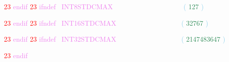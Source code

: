 \documentclass[8, usernames, dvipsnames]{beamer}
\begin{document}
\begin{frame}
 \textcolor{Red}{23}
\textcolor{Violet}{endif}
  \textcolor{Red}{23}
\textcolor{Violet}{ifndef}\textcolor{White}{\ }
\textcolor{Violet}{INT8STDCMAX}
 \textcolor{White}{\ }
\textcolor{White}{\ }
\textcolor{White}{\ }
\textcolor{White}{\ }
\textcolor{White}{\ }
\textcolor{White}{\ }
\textcolor{White}{\ }
\textcolor{White}{\ }
\textcolor{White}{\ }
\textcolor{White}{\ }
\textcolor{White}{\ }
\textcolor{White}{\ }
\textcolor{SkyBlue}{(}
\textcolor{SeaGreen}{127}
\textcolor{SkyBlue}{)}

  \textcolor{Red}{23}
\textcolor{Violet}{endif}
  \textcolor{Red}{23}
\textcolor{Violet}{ifndef}\textcolor{White}{\ }
\textcolor{Violet}{INT16STDCMAX}
 \textcolor{White}{\ }
\textcolor{White}{\ }
\textcolor{White}{\ }
\textcolor{White}{\ }
\textcolor{White}{\ }
\textcolor{White}{\ }
\textcolor{White}{\ }
\textcolor{White}{\ }
\textcolor{White}{\ }
\textcolor{White}{\ }
\textcolor{White}{\ }
\textcolor{SkyBlue}{(}
\textcolor{SeaGreen}{32767}
\textcolor{SkyBlue}{)}

  \textcolor{Red}{23}
\textcolor{Violet}{endif}
  \textcolor{Red}{23}
\textcolor{Violet}{ifndef}\textcolor{White}{\ }
\textcolor{Violet}{INT32STDCMAX}
 \textcolor{White}{\ }
\textcolor{White}{\ }
\textcolor{White}{\ }
\textcolor{White}{\ }
\textcolor{White}{\ }
\textcolor{White}{\ }
\textcolor{White}{\ }
\textcolor{White}{\ }
\textcolor{White}{\ }
\textcolor{White}{\ }
\textcolor{White}{\ }
\textcolor{SkyBlue}{(}
\textcolor{SeaGreen}{2147483647}
\textcolor{SkyBlue}{)}

  \textcolor{Red}{23}
\textcolor{Violet}{endif}
 \end{frame}
\end{document}
